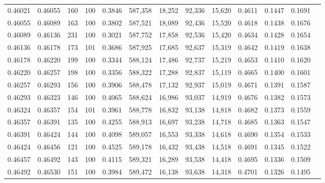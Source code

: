 \begin{tabular}{rrrrrrrrrrrrr}
0.46021 & 0.46055 &   160 & 100 &                                     0.3846 & 587,358 &  18,252 &  92,336 &  15,620 & 0.4611 & 0.1447 & 0.1691 \\
0.46055 & 0.46089 &   163 & 100 &                                     0.3802 & 587,521 &  18,089 &  92,436 &  15,520 & 0.4618 & 0.1438 & 0.1676 \\
0.46089 & 0.46136 &   231 & 100 &                                     0.3021 & 587,752 &  17,858 &  92,536 &  15,420 & 0.4634 & 0.1428 & 0.1654 \\
0.46136 & 0.46178 &   173 & 101 &                                     0.3686 & 587,925 &  17,685 &  92,637 &  15,319 & 0.4642 & 0.1419 & 0.1638 \\
0.46178 & 0.46220 &   199 & 100 &                                     0.3344 & 588,124 &  17,486 &  92,737 &  15,219 & 0.4653 & 0.1410 & 0.1620 \\
0.46220 & 0.46257 &   198 & 100 &                                     0.3356 & 588,322 &  17,288 &  92,837 &  15,119 & 0.4665 & 0.1400 & 0.1601 \\
0.46257 & 0.46293 &   156 & 100 &                                     0.3906 & 588,478 &  17,132 &  92,937 &  15,019 & 0.4671 & 0.1391 & 0.1587 \\
0.46293 & 0.46323 &   146 & 100 &                                     0.4065 & 588,624 &  16,986 &  93,037 &  14,919 & 0.4676 & 0.1382 & 0.1573 \\
0.46324 & 0.46357 &   154 & 101 &                                     0.3961 & 588,778 &  16,832 &  93,138 &  14,818 & 0.4682 & 0.1373 & 0.1559 \\
0.46357 & 0.46391 &   135 & 100 &                                     0.4255 & 588,913 &  16,697 &  93,238 &  14,718 & 0.4685 & 0.1363 & 0.1547 \\
0.46391 & 0.46424 &   144 & 100 &                                     0.4098 & 589,057 &  16,553 &  93,338 &  14,618 & 0.4690 & 0.1354 & 0.1533 \\
0.46424 & 0.46456 &   121 & 100 &                                     0.4525 & 589,178 &  16,432 &  93,438 &  14,518 & 0.4691 & 0.1345 & 0.1522 \\
0.46457 & 0.46492 &   143 & 100 &                                     0.4115 & 589,321 &  16,289 &  93,538 &  14,418 & 0.4695 & 0.1336 & 0.1509 \\
0.46492 & 0.46530 &   151 & 100 &                                     0.3984 & 589,472 &  16,138 &  93,638 &  14,318 & 0.4701 & 0.1326 & 0.1495 \\

\end{tabular}
